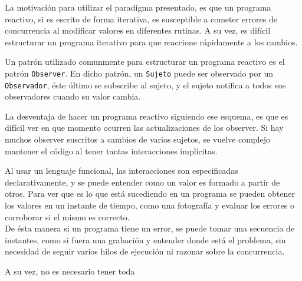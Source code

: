 
  La motivación para utilizar el paradigma presentado, es que un programa reactivo, si es escrito de
forma iterativa, es susceptible a cometer errores de concurrencia al modificar valores en diferentes
rutinas. A su vez, es difícil estructurar un programa iterativo para que reaccione rápidamente a
los cambios.

  Un patrón utilizado comunmente para estructurar un programa reactivo es el patrón \texttt{Observer}.
En dicho patrón, un \texttt{Sujeto} puede ser observado por un \texttt{Observador}, éste último se
subscribe al sujeto, y el sujeto notifica a todos sus observadores cuando su valor cambia.
  
  La desventaja de hacer un programa reactivo siguiendo ese esquema, es que es difícil ver en que
momento ocurren las actualizaciones de los observer. Si hay muchos observer suscritos a cambios
de varios sujetos, se vuelve complejo mantener el código al tener tantas interacciones implícitas.

  Al usar un lenguaje funcional, las interacciones son especificadas declarativamente, y se puede
entender como un valor es formado a partir de otros.
  Para ver que es lo que está sucediendo en un programa se pueden obtener los valores en un instante
de tiempo, como una fotografía y evaluar los errores o corroborar si el mismo es correcto.\\
  De ésta manera si un programa tiene un error, se puede tomar una secuencia de instantes,
como si fuera una grabación y entender donde está el problema,
sin necesidad de seguir varios hilos de ejecución ni razonar sobre la concurrencia.

  A su vez, no es necesario tener toda

